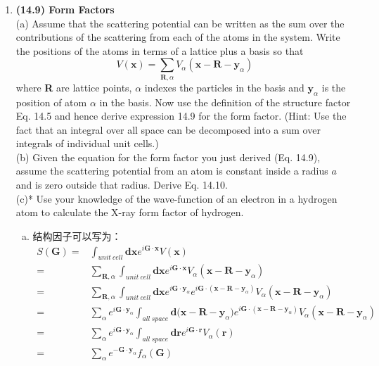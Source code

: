 \documentclass[reqno,a4paper,12pt]{amsart}
\begin{document}
\begin{enumerate}[1.]
\item \textbf{(14.9) Form Factors} \\
(a) Assume that the scattering potential can be written as the sum over the contributions of the scattering from each of the atoms in the system. Write the positions of the atoms in terms of a lattice plus a basis so that 
\[
	V(\mathbf{x}) = \sum_{\mathbf{R}, \alpha} V_\alpha(\mathbf{x} - \mathbf{R} - \mathbf{y}_\alpha)
\]
where \textbf{R} are lattice points, $\alpha$ indexes the particles in the basis and $\mathbf{y}_\alpha$ is the position of atom $\alpha$ in the basis. Now use the definition of the structure factor Eq. 14.5 and hence derive expression 14.9 for the form factor. (Hint: Use the fact that an integral over all space can be decomposed into a sum over integrals of individual unit cells.) \\ 
(b) Given the equation for the form factor you just derived (Eq. 14.9), assume the scattering potential from an atom is constant inside a radius $a$ and is zero outside that radius. Derive Eq. 14.10. \\
(c)* Use your knowledge of the wave-function of an electron in a hydrogen atom to calculate the X-ray form factor of hydrogen.
\begin{tcolorbox}[breakable, colback = black!5!white, colframe = black]
\begin{enumerate}[(a)]
\item 结构因子可以写为：
\begin{align*}
	S(\mathbf{G}) =& \int_{unit~cell} \mathbf{dx} e^{i\mathbf{G} \cdot \mathbf{x}} V(\mathbf{x}) \\
	=& \sum_{\mathbf{R},\alpha} \int_{unit~cell} \mathbf{dx} e^{i\mathbf{G} \cdot \mathbf{x}} V_\alpha(\mathbf{x}-\mathbf{R}-\mathbf{y}_\alpha) \\
	=& \sum_{\mathbf{R},\alpha} \int_{unit~cell} \mathbf{dx} e^{i\mathbf{G} \cdot \mathbf{y}_\alpha} e^{i\mathbf{G} \cdot (\mathbf{x}-\mathbf{R}-\mathbf{y}_\alpha)} V_\alpha(\mathbf{x}-\mathbf{R}-\mathbf{y}_\alpha) \\
	=& \sum_{\alpha} e^{i\mathbf{G}\cdot\mathbf{y}_\alpha} \int_{all~space} \mathbf{d(x-R-}\mathbf{y}_\alpha\mathbf{)} e^{i\mathbf{G} \cdot (\mathbf{x}-\mathbf{R}-\mathbf{y}_\alpha)} V_\alpha(\mathbf{x}-\mathbf{R}-\mathbf{y}_\alpha) \\
	=& \sum_{\alpha} e^{i\mathbf{G}\cdot\mathbf{y}_\alpha} \int_{all~space} \mathbf{dr} e^{i\mathbf{G}\cdot\mathbf{r}} V_\alpha(\mathbf{r}) \\
	=& \sum_\alpha e^{-\mathbf{G}\cdot\mathbf{y}_\alpha} f_\alpha(\mathbf{G})

\end{align*}
\end{enumerate}
\end{tcolorbox}
\end{enumerate}
\end{document}
